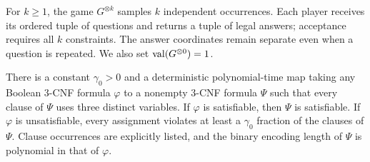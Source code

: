 For $k\geq1$, the game $G^{\otimes k}$ samples $k$ independent
occurrences.  Each player receives its ordered tuple of questions and
returns a tuple of legal answers; acceptance requires all $k$
constraints.  The answer coordinates remain separate even when a
question is repeated.  We also set $\operatorname{val}(G^{\otimes0})=1$.

\begin{theorem}
\label{thm:pcp}
There is a constant $\gamma_0>0$ and a deterministic polynomial-time
map taking any Boolean $3$-CNF formula $\varphi$ to a nonempty $3$-CNF
formula $\Psi$ such that every clause of $\Psi$ uses three distinct
variables.  If $\varphi$ is satisfiable, then $\Psi$ is satisfiable.
If $\varphi$ is unsatisfiable, every assignment violates at least a
$\gamma_0$ fraction of the clauses of $\Psi$.
Clause occurrences are explicitly listed, and the binary encoding
length of $\Psi$ is polynomial in that of $\varphi$.
\end{theorem}


